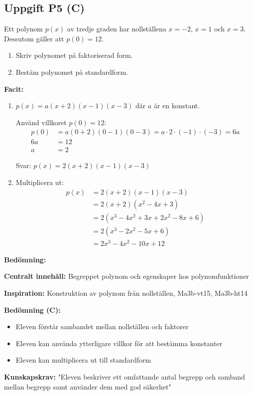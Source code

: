 \documentclass[12pt]{article}
\begin{document}
\subsection*{Uppgift P5 (C)}
Ett polynom $p(x)$ av tredje graden har nollställena $x = -2$, $x = 1$ och $x = 3$. Dessutom gäller att $p(0) = 12$.
\begin{enumerate}[label=\alph*)]
    \item Skriv polynomet på faktoriserad form.
    \item Bestäm polynomet på standardform.
\end{enumerate}

\begin{facitbox}
\textbf{Facit:}

\begin{enumerate}[label=\alph*)]
    \item $p(x) = a(x + 2)(x - 1)(x - 3)$ där $a$ är en konstant.
    
    Använd villkoret $p(0) = 12$:
    \begin{align*}
    p(0) &= a(0 + 2)(0 - 1)(0 - 3) = a \cdot 2 \cdot (-1) \cdot (-3) = 6a \\
    6a &= 12 \\
    a &= 2
    \end{align*}
    
    Svar: $p(x) = 2(x + 2)(x - 1)(x - 3)$
    
    \item Multiplicera ut:
    \begin{align*}
    p(x) &= 2(x + 2)(x - 1)(x - 3) \\
    &= 2(x + 2)(x^2 - 4x + 3) \\
    &= 2(x^3 - 4x^2 + 3x + 2x^2 - 8x + 6) \\
    &= 2(x^3 - 2x^2 - 5x + 6) \\
    &= 2x^3 - 4x^2 - 10x + 12
    \end{align*}
\end{enumerate}
\end{facitbox}

\begin{refbox}
\textbf{Bedömning:}

\textbf{Centralt innehåll:} Begreppet polynom och egenskaper hos polynomfunktioner

\textbf{Inspiration:} Konstruktion av polynom från nollställen, Ma3b-vt15, Ma3b-ht14

\textbf{Bedömning (C):}
\begin{itemize}
    \item Eleven förstår sambandet mellan nollställen och faktorer
    \item Eleven kan använda ytterligare villkor för att bestämma konstanter
    \item Eleven kan multiplicera ut till standardform
\end{itemize}

\textbf{Kunskapskrav:} "Eleven beskriver ett omfattande antal begrepp och samband mellan begrepp samt använder dem med god säkerhet"
\end{refbox}
\end{document}
